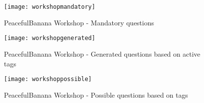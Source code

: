 \begin{figure}[H]
    \centering
        \texttt{[image: workshopmandatory]}
    \caption{PeacefulBanana Workshop - Mandatory questions}
    \label{workshopmandatoryfunc}
\end{figure}
\begin{figure}[H]
    \centering
        \texttt{[image: workshopgenerated]}
    \caption{PeacefulBanana Workshop - Generated questions based on active tags}
    \label{workshopgeneratedfunc}
\end{figure}
\begin{figure}[H]
    \centering
        \texttt{[image: workshoppossible]}
    \caption{PeacefulBanana Workshop - Possible questions based on tags}
    \label{workshoppossiblefunc}
\end{figure}
